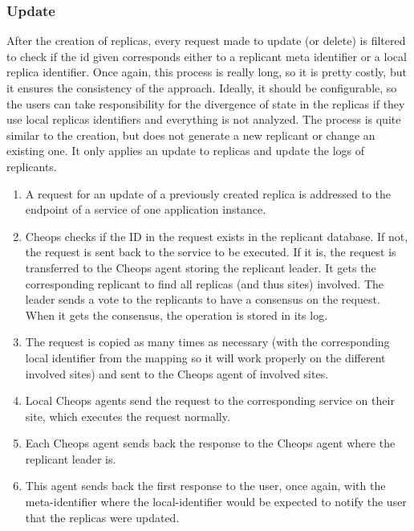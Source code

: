 \subsubsection{Update}

After the creation of replicas, every request made to update (or
delete) is filtered to check if the id given corresponds either to a
replicant meta identifier or a local replica identifier.
%
Once again, this process is really long, so it is pretty costly, but
it ensures the consistency of the approach.
%
Ideally, it should be configurable, so the users can take
responsibility for the divergence of state in the replicas if they use
local replicas identifiers and everything is not analyzed.
%
The process is quite similar to the creation, but does not generate a
new replicant or change an existing one.
%
It only applies an update to replicas and update the logs of
replicants.
\begin{enumerate}
\item
  A request for an update of a previously created replica is
  addressed to the endpoint of a service of one application instance.
\item Cheops checks if the ID in the request exists in the replicant
  database.
  If not, the request is sent back to the service to be executed.
  If it is, the request is transferred to the Cheops agent storing
  the replicant leader.
  It gets the corresponding replicant to find all replicas (and thus
  sites) involved.
  The leader sends a vote to the replicants to have a consensus on the
  request.
  When it gets the consensus, the operation is stored in its log.
\item The request is copied as many times as necessary (with the
  corresponding local identifier from the mapping so it will work
  properly on the different involved sites) and sent to the Cheops
  agent of involved sites.
\item
  Local Cheops agents send the request to the corresponding service on
  their site, which executes the request normally.
\item
  Each Cheops agent sends back the response to the Cheops agent where
  the replicant leader is.
\item This agent sends back the first response to the user, once
  again, with the meta-identifier where the local-identifier would be
  expected to notify the user that the replicas were updated.
\end{enumerate}



